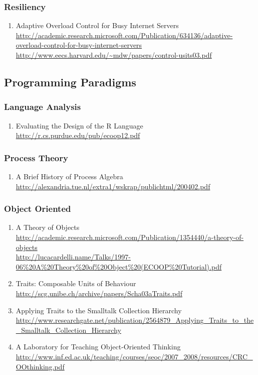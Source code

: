 \documentclass{article}
\begin{document}
\subsubsection{Resiliency}


\begin{enumerate}
	\item {Adaptive Overload Control for Busy Internet Servers\\
\href{http://academic.research.microsoft.com/Publication/634136/adaptive-overload-control-for-busy-internet-servers}{http://academic.research.microsoft.com/Publication/634136/adaptive-overload-control-for-busy-internet-servers}\\
\url{http://www.eecs.harvard.edu/~mdw/papers/control-usits03.pdf}}
\end{enumerate}


\subsection{Programming Paradigms}
\subsubsection{Language Analysis}
\begin{enumerate}
	\item {Evaluating the Design of the R Language\\ \url{http://r.cs.purdue.edu/pub/ecoop12.pdf}}
\end{enumerate}
\subsubsection{Process Theory}
\begin{enumerate}
	\item {A Brief History of Process Algebra\\
\url{http://alexandria.tue.nl/extra1/wskrap/publichtml/200402.pdf}}
\end{enumerate}
\subsubsection{Object Oriented}
\begin{enumerate}
	\item {A Theory of Objects\\
\url{http://academic.research.microsoft.com/Publication/1354440/a-theory-of-objects}\\
\url{http://lucacardelli.name/Talks/1997-06\%20A\%20Theory\%20of\%20Object\%20(ECOOP\%20Tutorial).pdf}}
	\item {Traits: Composable Units of Behaviour\\
\url{http://scg.unibe.ch/archive/papers/Scha03aTraits.pdf}}
	\item {Applying Traits to the Smalltalk Collection Hierarchy\\
\url{http://www.researchgate.net/publication/2564879_Applying_Traits_to_the_Smalltalk_Collection_Hierarchy}}
	\item {A Laboratory for Teaching Object-Oriented Thinking\\
\url{http://www.inf.ed.ac.uk/teaching/courses/seoc/2007_2008/resources/CRC_OOthinking.pdf}}
\end{enumerate}
\end{document}
